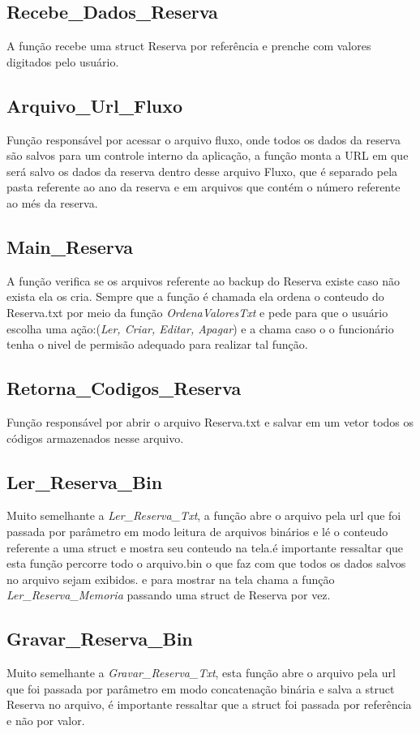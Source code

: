 \documentclass{article}
\begin{document}
\subsection{Recebe\_Dados\_Reserva}
	A função recebe uma struct  Reserva por referência e prenche com valores digitados pelo usuário.
	
\subsection{Arquivo\_Url\_Fluxo}
	Função responsável por acessar o arquivo fluxo, onde todos os dados da reserva são salvos para um controle interno da aplicação, a função monta a URL em que será salvo os dados da reserva dentro desse arquivo Fluxo, que é separado pela pasta referente ao ano da reserva e em arquivos que contém o número referente ao més da reserva.

\subsection{Main\_Reserva}
		A função verifica se os arquivos referente ao backup do Reserva existe caso não exista ela os cria. Sempre que a função é chamada ela ordena o conteudo do Reserva.txt por meio da função \textit{OrdenaValoresTxt} e pede para que o usuário escolha uma ação:(\textit{Ler, Criar, Editar, Apagar})  e a chama caso o  o funcionário tenha o nivel de permisão adequado para realizar tal função.

\subsection{Retorna\_Codigos\_Reserva}
	Função responsável por abrir o arquivo Reserva.txt e salvar em um vetor todos os códigos armazenados nesse arquivo.
	
\subsection{Ler\_Reserva\_Bin}
	Muito semelhante a \textit{Ler\_Reserva\_Txt}, a função abre o arquivo pela url que foi passada por parâmetro em modo leitura de arquivos binários e lé o conteudo referente a uma struct e mostra seu conteudo na tela.é importante ressaltar que esta função percorre todo o arquivo.bin o que faz com que todos os dados salvos no arquivo sejam exibidos. e para mostrar na tela chama a função \textit{Ler\_Reserva\_Memoria} passando uma struct de Reserva por vez.

\subsection{Gravar\_Reserva\_Bin}
	Muito semelhante a \textit{Gravar\_Reserva\_Txt}, esta função abre o arquivo pela url que foi passada por parâmetro em modo concatenação binária e salva a struct Reserva  no arquivo, é importante ressaltar que  a struct foi passada por referência e não por valor.
\end{document}

